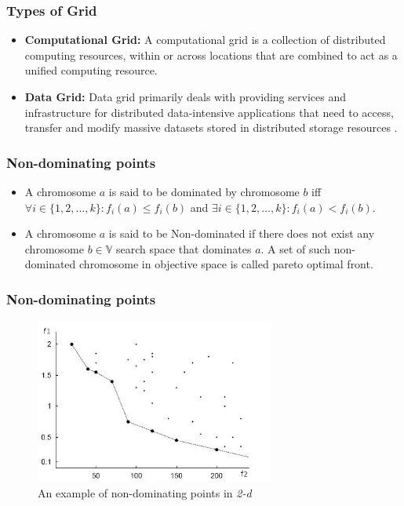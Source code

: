 \documentclass{beamer}
\begin{document}
\begin{frame}[label=supplement3]
 \frametitle{Types of Grid} 
\begin{itemize} 
\item \textbf{Computational Grid:} A computational grid is a collection of distributed computing resources, within or across locations that are combined
to act as a unified computing resource.
\item  \textbf{Data Grid:} Data grid primarily deals with providing services and infrastructure for distributed data-intensive applications that need to access, transfer
and modify massive datasets stored in distributed storage resources \cite{chervenak2000data}.
\vspace{-2pt}
\hyperlink{back2}{}
\end{itemize}
\end{frame}

\begin{frame}[label=nds]
 \frametitle{Non-dominating points}
\begin{itemize} 
	\item A chromosome $a$ is said to be dominated by chromosome $b$ iff $\forall i \in \{1,2,\ldots,k\}: f_i(a) \leq f_i(b)$ and $\exists i \in \{1,2,\ldots,k\}: f_i(a) < f_i(b)$.
	\item A chromosome $a$ is said to be Non-dominated if there does not exist any chromosome $b\in \mathbb{V}$ search space that dominates $a$. A set of such non-dominated chromosome in objective space is called pareto optimal front. \hyperlink{back4}{}
\end{itemize}
\end{frame}

\begin{frame}[label=nds1]
 \frametitle{Non-dominating points}
\begin{figure}[h]
 \begin{center}
  \includegraphics[width=0.70\textwidth]{imgs/nondom}
 \end{center}
  \caption{An example of non-dominating points in \emph{2-d} \hyperlink{back4}{} \hyperlink{chromosomemod}{}}
\end{figure}
\end{frame}
\end{document}
